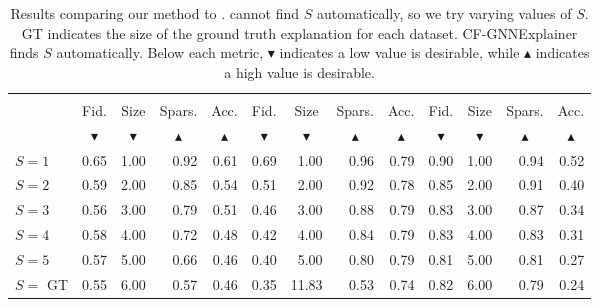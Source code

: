 
\begin{table*}[]
\centering
\caption{Results comparing our method to \gnnexplainer{}. \gnnexplainer{} cannot find $S$ automatically, so we try varying values of $S$. GT indicates the size of the ground truth explanation for each dataset. CF-GNNExplainer finds $S$ automatically. Below each metric, $\blacktriangledown$ indicates a low value is desirable, while $\blacktriangle$ indicates a high value is desirable.}
\label{table:results-gnnexplainer}
\setlength{\tabcolsep}{4pt}
\scriptsize{
\begin{tabular}{lrrrr rrrr rrrr}
\toprule
\multicolumn{1}{c}{} & \multicolumn{4}{c}{\synfour{}}                                                                                                                 & \multicolumn{4}{c}{\synfive{}}                                                                                                                   & \multicolumn{4}{c}{\synone{}}                                                                                                                  \\ 
\cmidrule(r){2-5}\cmidrule(r){6-9}\cmidrule{10-13} 
               & \multicolumn{1}{c}{Fid.} & \multicolumn{1}{c}{Size} & \multicolumn{1}{c}{Spars.} & \multicolumn{1}{c}{Acc.} & \multicolumn{1}{c}{Fid.} & \multicolumn{1}{c}{Size} & \multicolumn{1}{c}{Spars.} & \multicolumn{1}{c}{Acc.} & \multicolumn{1}{c}{Fid.} & \multicolumn{1}{c}{Size} & \multicolumn{1}{c}{Spars.} & \multicolumn{1}{c}{Acc.} \\
\gnnexpshort{} & \multicolumn{1}{c}{$\blacktriangledown$} &\multicolumn{1}{c}{$\blacktriangledown$} &\multicolumn{1}{c}{$\blacktriangle$} & \multicolumn{1}{c}{$\blacktriangle$} & \multicolumn{1}{c}{$\blacktriangledown$} &\multicolumn{1}{c}{$\blacktriangledown$} &\multicolumn{1}{c}{$\blacktriangle$} & \multicolumn{1}{c}{$\blacktriangle$} & \multicolumn{1}{c}{$\blacktriangledown$} &\multicolumn{1}{c}{$\blacktriangledown$} &\multicolumn{1}{c}{$\blacktriangle$} & \multicolumn{1}{c}{$\blacktriangle$} \\
\midrule


 $S=1$ & 0.65 & 1.00 & 0.92 & 0.61 & 0.69 & 1.00 & 0.96 & 0.79 & 0.90 & 1.00 & 0.94 & 0.52 \\
 $S=2$ & 0.59 & 2.00 & 0.85 & 0.54 & 0.51 & 2.00 & 0.92 & 0.78 & 0.85 & 2.00 & 0.91 & 0.40  \\
 $S=3$ & 0.56 & 3.00 & 0.79 & 0.51 & 0.46 & 3.00 & 0.88 & 0.79 & 0.83 & 3.00 & 0.87 & 0.34 \\
 $S=4$ & 0.58 & 4.00 & 0.72 & 0.48 & 0.42 & 4.00 & 0.84 & 0.79 & 0.83 & 4.00 & 0.83 & 0.31 \\
 $S=5$ & 0.57 & 5.00 & 0.66 & 0.46 & 0.40 & 5.00 & 0.80  & 0.79 & 0.81 & 5.00 & 0.81 & 0.27 \\
 $S=$ GT &  0.55 &	6.00 & 0.57 &	0.46 &	0.35 &	11.83 &	0.53 &	0.74 &	0.82 &	6.00 &	0.79 &	0.24    \\


\end{tabular}}
\end{table*}
